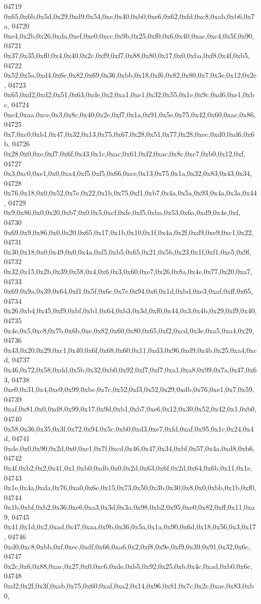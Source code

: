 \begin{DoxyCode}
04719   0x65,0x6b,0x5d,0x29,0xd9,0x54,0xe,0x40,0xb0,0xe6,0x62,0xfd,0xc8,0xab,0xb6,0x7a,
04720   0xe4,0x2b,0x26,0xda,0xef,0xe0,0xcc,0x9b,0x25,0xf0,0x6,0x40,0xac,0xc4,0x5f,0x90,
04721   0x37,0x35,0xf0,0x4,0x40,0x2c,0xf9,0xf7,0x88,0x80,0x17,0x0,0xba,0xf8,0x4f,0xb5,
04722   0x52,0x5a,0xd4,0x6c,0x82,0x69,0x36,0xbb,0x18,0xf6,0x82,0x80,0x7,0x3e,0x12,0x2e,
04723   0x65,0xd2,0xd2,0x51,0x63,0xde,0x2,0xa1,0xe1,0x32,0x55,0x1e,0x9c,0xd6,0xe1,0xbc,
04724   0xe4,0xaa,0xce,0x3,0x8c,0x40,0x2e,0xf7,0x1a,0x91,0x5e,0x75,0x42,0x60,0xac,0x86,
04725   0x7,0xc0,0xb1,0x47,0x32,0x13,0x75,0x67,0x28,0x51,0x77,0x28,0xec,0xd0,0xd6,0x6b,
04726   0x28,0x0,0xe,0xf7,0x6f,0x43,0x1c,0xac,0x61,0xf2,0xac,0x8c,0xc7,0xb0,0x12,0xf,
04727   0x3,0xc0,0xe1,0x0,0xa4,0xf5,0xf5,0x66,0xce,0x13,0x75,0x1a,0x32,0x83,0x43,0x34,
04728   0x76,0x18,0x0,0x52,0x7e,0x22,0x1b,0x75,0xf1,0xb7,0x4a,0x5a,0x93,0x4a,0x3a,0x44,
04729   0x9,0x86,0x0,0x20,0xb7,0x0,0x5,0xcf,0xfe,0xf5,0xba,0x53,0x6a,0xd9,0x4e,0xf,
04730   0x69,0x9,0x86,0x0,0x20,0x65,0x17,0x1b,0x10,0x1f,0x4a,0x2f,0xd9,0xe9,0xc1,0x22,
04731   0x30,0x18,0x0,0x49,0x0,0x4a,0xf5,0xb5,0x65,0x21,0x5b,0x23,0x1f,0xf1,0xe5,0x9f,
04732   0x32,0x15,0x2b,0x39,0x58,0x4,0x6,0x3,0x60,0xe7,0x26,0x8a,0x4e,0x77,0x20,0xa7,
04733   0x69,0x9a,0x39,0x64,0xf1,0x5f,0x6c,0x7e,0x94,0x6,0x1d,0xbd,0xe3,0xaf,0xff,0x65,
04734   0x26,0xb4,0x45,0xf9,0xbf,0xb1,0x64,0xb3,0x3d,0xf0,0x44,0x3,0x4b,0x29,0xf9,0x40,
04735   0x4e,0x5,0xc8,0x7b,0x6b,0xe,0x82,0x60,0x80,0x65,0xf2,0xcd,0x3e,0xa5,0xa4,0x29,
04736   0x43,0x20,0x29,0xc1,0x40,0x6f,0x68,0x60,0x11,0xd3,0x96,0xd9,0x4b,0x25,0xa4,0xcd,
04737   0x46,0x72,0x58,0xdd,0x5b,0x32,0xb0,0x92,0xf7,0xf7,0xa1,0xa8,0x99,0x7a,0x47,0x63,
04738   0xe0,0x31,0x4,0xe9,0x99,0xbc,0x7c,0x52,0xf3,0x52,0x29,0xdb,0x76,0xe1,0x7,0x59,
04739   0xaf,0x81,0x0,0xd8,0x99,0x17,0x9d,0xb1,0xb7,0xe6,0x12,0x30,0x52,0x42,0x1,0xb0,
04740   0x58,0x36,0x35,0x3f,0x72,0x94,0x5c,0xb0,0xd3,0xe7,0xfd,0xaf,0x95,0x1c,0x24,0x4d,
04741   0xde,0x0,0x90,0x2d,0x0,0xe1,0x7f,0xcd,0x46,0x47,0x34,0xbf,0x57,0x4a,0xd8,0xb6,
04742   0x4f,0xb2,0x2,0x41,0x1,0xb0,0xdb,0x0,0x2d,0x63,0x6f,0x2d,0x64,0x6b,0x11,0x1e,
04743   0x1e,0x4a,0xda,0x76,0xa0,0x6e,0x15,0x73,0x50,0x3b,0x30,0x8,0x0,0xbb,0x1b,0xf0,
04744   0x1b,0xbf,0xb2,0x36,0xe6,0xa3,0x3d,0x3a,0x98,0xb2,0x95,0xe0,0x82,0xff,0x11,0xa9,
04745   0x41,0x1d,0x2,0xad,0x47,0xaa,0x9b,0x36,0x5a,0x1a,0x90,0x6d,0x18,0x56,0x3,0x17,
04746   0xd0,0xc8,0xbb,0xf,0xec,0xdf,0x66,0xa6,0x2,0xf8,0x9e,0xf9,0x39,0x91,0x32,0x6c,
04747   0x2c,0x6,0x88,0xac,0x27,0x0,0xc6,0xde,0xb5,0x92,0x25,0xb,0x4c,0xad,0xb0,0x6c,
04748   0xd2,0x2f,0x3f,0xab,0x75,0x60,0xaf,0xa2,0x14,0x96,0x81,0x7c,0x2c,0xae,0x83,0xb0,

\end{DoxyCode}
